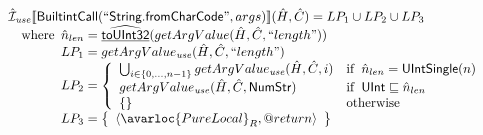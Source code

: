 \[\begin{array}{l}
\aI_{\it use}\lbr \SF{BuiltintCall}(``\SF{String.fromCharCode}",args)\rbr(\hat{H},\hat{C}) = LP_1 \cup LP_2 \cup LP_3\\
\quad\wherec{
  \hat{n}_{len} = \ahf{toUInt32}(getArgValue(\hat{H}, \hat{C}, ``length"))\\
  LP_1 = getArgValue_{\it use}(\hat{H}, \hat{C}, ``length")\\
  LP_2 = \left\{\begin{array}{ll}
      \bigcup_{i \in \{0,...,n-1\} } getArgValue_{\it use}(\hat{H}, \hat{C}, i)
      & \ifc{\hat{n}_{len} = \SF{UIntSingle}(n)}\\
      getArgValue_{\it use}(\hat{H}, \hat{C}, \SF{NumStr})
      & \ifc{\SF{UInt} \sqsubseteq \hat{n}_{len}}\\
      \set{} & \owc
    \end{array}\right.\\
  LP_3 = \set{\langle\avarloc{PureLocal}_R,\varprop{return}\rangle}\\
  }\\
\\

\end{array}
\]



